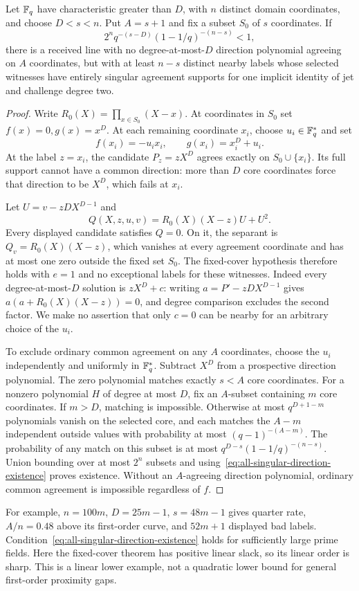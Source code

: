 \begin{proposition}
\label{prop:all-singular-linear-lower}
Let $\mathbb F_q$ have characteristic greater than $D$, with $n$ distinct domain
coordinates, and choose $D<s<n$. Put $A=s+1$ and fix a subset $S_0$ of
$s$ coordinates. If
\begin{equation}\label{eq:all-singular-direction-existence}
 2^nq^{-(s-D)}(1-1/q)^{-(n-s)}<1,
\end{equation}
there is a received line with no degree-at-most-$D$ direction polynomial
agreeing on $A$ coordinates, but with at least $n-s$ distinct nearby
labels whose selected witnesses have entirely singular agreement supports
for one implicit identity of jet and challenge degree two.
\end{proposition}
\begin{proof}
Write $R_0(X)=\prod_{x\in S_0}(X-x)$. At coordinates in $S_0$ set
$f(x)=0,g(x)=x^D$. At each remaining coordinate $x_i$, choose
$u_i\in\mathbb F_q^*$ and set
\[
 f(x_i)=-u_ix_i,\qquad g(x_i)=x_i^D+u_i.
\]
At the label $z=x_i$, the candidate $P_z=zX^D$ agrees exactly on
$S_0\cup\{x_i\}$. Its full support cannot have a common direction:
more than $D$ core coordinates force that direction to be $X^D$, which
fails at $x_i$.

Let $U=v-zDX^{D-1}$ and
\[
 Q(X,z,u,v)=R_0(X)(X-z)U+U^2.
\]
Every displayed candidate satisfies $Q=0$. On it, the separant is
$Q_v=R_0(X)(X-z)$, which vanishes at every agreement coordinate and has
at most one zero outside the fixed set $S_0$. The fixed-cover hypothesis
therefore holds with $e=1$ and no exceptional labels for these witnesses.
Indeed every degree-at-most-$D$ solution is $zX^D+c$: writing
$a=P'-zDX^{D-1}$ gives $a(a+R_0(X)(X-z))=0$, and degree comparison
excludes the second factor. We make no assertion that only $c=0$ can
be nearby for an arbitrary choice of the $u_i$.

To exclude ordinary common agreement on any $A$ coordinates, choose the
$u_i$ independently and uniformly in $\mathbb F_q^*$. Subtract $X^D$ from a
prospective direction polynomial. The zero polynomial matches exactly
$s<A$ core coordinates. For a nonzero polynomial $H$ of degree at most
$D$, fix an $A$-subset containing $m$ core coordinates. If $m>D$,
matching is impossible. Otherwise at most $q^{D+1-m}$ polynomials vanish
on the selected core, and each matches the $A-m$ independent outside
values with probability at most $(q-1)^{-(A-m)}$. The probability of any
match on this subset is at most
$q^{D-s}(1-1/q)^{-(n-s)}$. Union bounding over at most $2^n$ subsets
and using~\eqref{eq:all-singular-direction-existence} proves existence.
Without an $A$-agreeing direction polynomial, ordinary common agreement
is impossible regardless of $f$.
\end{proof}

For example, $n=100m$, $D=25m-1$, $s=48m-1$ gives quarter rate,
$A/n=0.48$ above its first-order curve, and $52m+1$ displayed bad labels.
Condition~\eqref{eq:all-singular-direction-existence} holds for sufficiently
large prime fields. Here the fixed-cover theorem has positive linear
slack, so its linear order is sharp. This is a linear lower example,
not a quadratic lower bound for general first-order proximity gaps.
